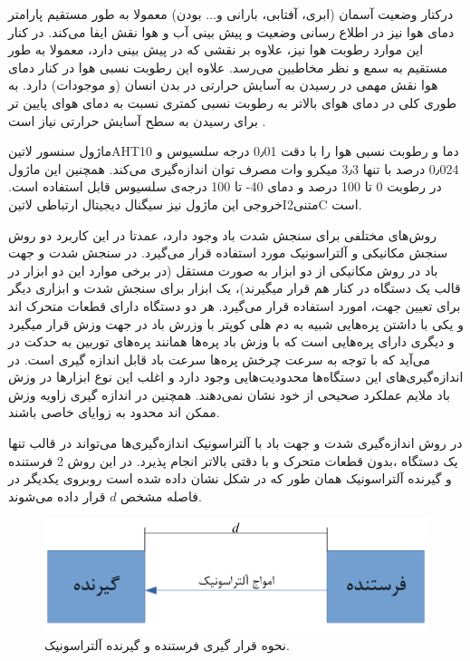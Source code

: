 
درکتار وضعیت آسمان (ابری، آفتابی، بارانی و... بودن) معمولا به طور مستقیم پارامتر دمای هوا نیز در اطلاع رسانی وضعیت و پیش بینی آب و هوا نقش ایفا می‌کند. در کنار این موارد رطوبت هوا نیز، علاوه بر نقشی که در پیش بینی دارد، معمولا به طور مستقیم به سمع و نظر مخاطبین می‌رسد. علاوه این رطوبت نسبی هوا در کنار دمای هوا نقش مهمی در رسیدن به آسایش حرارتی در بدن انسان (و موجودات) دارد. به طوری کلی در دمای هوای بالاتر به رطوبت نسبی کمتری نسبت به دمای هوای پایین تر برای رسیدن به سطح آسایش  حرارتی نیاز است . 

ماژول سنسور ‌لاتین{AHT10} دما و رطوبت نسبی هوا را با دقت 0٫01 درجه سلسیوس و 0٫024 درصد با تنها 3٫3 میکرو وات مصرف توان اندازه‌گیری می‌کند. همچنین این ماژول در رطوبت 0 تا 100 درصد و دمای  40- تا 100 درجه‌ی سلسیوس قابل استفاده است. خروجی این ماژول نیز سیگنال دیجیتال ارتباطی ‌لاتین{I‌متنی{2}C} است. 


روش‌های مختلفی برای سنجش شدت باد وجود دارد، عمدتا در این کاربرد دو روش سنجش مکانیکی و آلتراسونیک مورد استفاده قرار می‌گیرد. در سنجش شدت و جهت باد در روش مکانیکی از دو ابزار به صورت مستقل (در برخی موارد این دو ابزار در قالب یک دستگاه در کنار هم قرار میگیرند)، یک ابزار برای سنجش شدت و ابزاری دیگر برای تعیین جهت، امورد استفاده قرار می‌گیرد. هر دو دستگاه دارای قطعات متحرک اند و یکی با داشتن پره‌هایی شبیه به دم هلی کوپتر با وزرش باد در جهت وزش قرار میگیرد و دیگری دارای پره‌هایی است که با وزش باد پره‌ها همانند پره‌های توربین به حدکت در می‌آید که با توجه به سرعت چرخش پره‌ها سرعت باد قابل اندازه‌ گیری است. در اندازه‌گیری‌های این دستگاه‌ها محدودیت‌هایی وجود دارد و اغلب این نوع ابزارها در وزش باد ملایم عملکرد صحیحی از خود نشان نمی‌دهند. همچنین در اندازه گیری زاویه وزش ممکن اند محدود به زوایای خاصی باشند. 

در روش اندازه‌گیری شدت و جهت باد با آلتراسونیک اندازه‌گیری‌ها می‌تواند در قالب تنها یک دستگاه ،بدون قطعات متحرک و با دقتی بالاتر انجام پذیرد. در این روش 2 فرستنده و گیرنده آلتراسونیک همان طور که در شکل  نشان داده شده است روبروی یکدیگر در فاصله‌ مشخص $d$ قرار داده می‌شوند.

\begin{figure}[!h]
	\centering
	\includegraphics[width=0.6\linewidth]{Assets/ultrasonic one axis.pdf}
	\caption{نحوه قرار گیری فرستنده و گیرنده آلتراسونیک.}
	\label{fig:oneAxisUltrasonic}
\end{figure}

